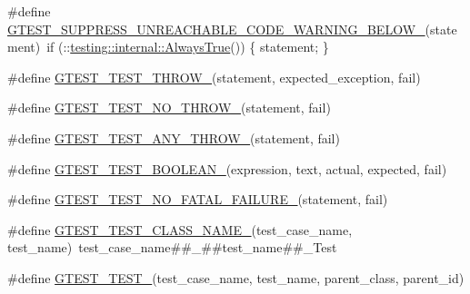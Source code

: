 \begin{DoxyCompactItemize}
\item 
\#define \hyperlink{gtest-internal_8h_a2e66f7dfc5cb87e0fa0289f653173c69}{G\+T\+E\+S\+T\+\_\+\+S\+U\+P\+P\+R\+E\+S\+S\+\_\+\+U\+N\+R\+E\+A\+C\+H\+A\+B\+L\+E\+\_\+\+C\+O\+D\+E\+\_\+\+W\+A\+R\+N\+I\+N\+G\+\_\+\+B\+E\+L\+O\+W\+\_\+}(statement)~if (\+::\hyperlink{namespacetesting_1_1internal_a922c9da63cd4bf94fc473b9ecac76414}{testing\+::internal\+::\+Always\+True}()) \{ statement; \}
\item 
\#define \hyperlink{gtest-internal_8h_a3f71db93eaf30b0cfca9612b9ac32106}{G\+T\+E\+S\+T\+\_\+\+T\+E\+S\+T\+\_\+\+T\+H\+R\+O\+W\+\_\+}(statement,  expected\+\_\+exception,  fail)
\item 
\#define \hyperlink{gtest-internal_8h_a9a109d026b5a904646437d7570e13581}{G\+T\+E\+S\+T\+\_\+\+T\+E\+S\+T\+\_\+\+N\+O\+\_\+\+T\+H\+R\+O\+W\+\_\+}(statement,  fail)
\item 
\#define \hyperlink{gtest-internal_8h_af48bbd26d54d4afc5e4cef39b1c76ba3}{G\+T\+E\+S\+T\+\_\+\+T\+E\+S\+T\+\_\+\+A\+N\+Y\+\_\+\+T\+H\+R\+O\+W\+\_\+}(statement,  fail)
\item 
\#define \hyperlink{gtest-internal_8h_ae8912365e1d00a7a2bd248268c64aa1a}{G\+T\+E\+S\+T\+\_\+\+T\+E\+S\+T\+\_\+\+B\+O\+O\+L\+E\+A\+N\+\_\+}(expression,  text,  actual,  expected,  fail)
\item 
\#define \hyperlink{gtest-internal_8h_a1b37a3c446836d33040f3266a6236081}{G\+T\+E\+S\+T\+\_\+\+T\+E\+S\+T\+\_\+\+N\+O\+\_\+\+F\+A\+T\+A\+L\+\_\+\+F\+A\+I\+L\+U\+R\+E\+\_\+}(statement,  fail)
\item 
\#define \hyperlink{gtest-internal_8h_a87a1ee3a3b9b798195236d053f2e5dcc}{G\+T\+E\+S\+T\+\_\+\+T\+E\+S\+T\+\_\+\+C\+L\+A\+S\+S\+\_\+\+N\+A\+M\+E\+\_\+}(test\+\_\+case\+\_\+name,  test\+\_\+name)~test\+\_\+case\+\_\+name\#\#\+\_\+\#\#test\+\_\+name\#\#\+\_\+\+Test
\item 
\#define \hyperlink{gtest-internal_8h_ae2d26f0f92fbaf62bf4c1eca45bb2f1f}{G\+T\+E\+S\+T\+\_\+\+T\+E\+S\+T\+\_\+}(test\+\_\+case\+\_\+name,  test\+\_\+name,  parent\+\_\+class,  parent\+\_\+id)
\end{DoxyCompactItemize}
